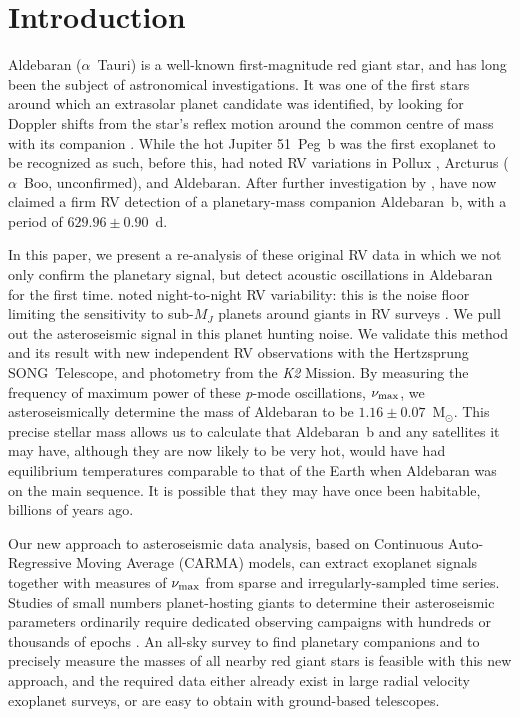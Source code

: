 \documentclass[modern]{aastex61}
\newcommand{\numax}{\mbox{$\nu_{\rm max}$}\xspace}
\newcommand{\msun}{\mbox{$\mathrm{M}_{\odot}$}\xspace}
\newcommand{\ktwo}{\emph{K2}\xspace}
\begin{document}
\section{Introduction}

Aldebaran ($\alpha$~Tauri) is a well-known first-magnitude red giant star, and has long been the subject of astronomical investigations. It was one of the first stars around which an extrasolar planet candidate was identified, by looking for Doppler shifts from the star's reflex motion around the common centre of mass with its companion \citep[the radial velocity or RV method;][]{struverv}. While the hot Jupiter 51~Peg~b \citep{51peg} was the first exoplanet to be recognized as such, before this, \citet{hatzes1993} had noted RV variations in Pollux \citep[$\beta$~Gem; subsequently confirmed as a planet:][]{betgemconf,betgemconf2}, Arcturus ($\alpha$~Boo, unconfirmed), and Aldebaran. After further investigation by \citet{Hatzes1998}, \citet{Hatzes2015} have now claimed a firm RV detection of a planetary-mass companion Aldebaran~b, with a period of $629.96 \pm 0.90$~d.

In this paper, we present a re-analysis of these original RV data in which we not only confirm the planetary signal, but detect acoustic oscillations in Aldebaran for the first time. \citet{hatzes1993} noted night-to-night RV variability: this is the noise floor limiting the sensitivity to sub-$M_J$ planets around giants in RV surveys \citep{2005PASJ...57...97S,2014A&A...566A.113J}. We pull out the asteroseismic signal in this planet hunting noise. We validate this method and its result with new independent RV observations with the Hertzsprung SONG~Telescope, and photometry from the \ktwo Mission. By measuring the frequency of maximum power of these \emph{p}-mode oscillations, \numax, we asteroseismically determine the mass of Aldebaran to be $1.16 \pm 0.07$~\msun. This precise stellar mass allows us to calculate that Aldebaran~b and any satellites it may have, although they are now likely to be very hot, would have had equilibrium temperatures comparable to that of the Earth when Aldebaran was on the main sequence. It is possible that they may have once been habitable, billions of years ago.

Our new approach to asteroseismic data analysis, based on Continuous Auto-Regressive Moving Average (CARMA) models, can extract exoplanet signals together with measures of \numax from sparse and irregularly-sampled time series. Studies of small numbers planet-hosting giants to determine their asteroseismic parameters ordinarily require dedicated observing campaigns with hundreds or thousands of epochs \citep{2017MNRAS.472.4110S}. An all-sky survey to find planetary companions and to precisely measure the masses of all nearby red giant stars is feasible with this new approach, and the required data either already exist in large radial velocity exoplanet surveys, or are easy to obtain with ground-based telescopes.
\end{document}
